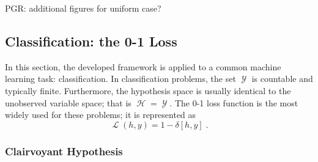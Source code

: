 \documentclass[12pt]{report}
\DeclareMathOperator{\Xcal}{\mathcal{X}}
\DeclareMathOperator{\Ycal}{\mathcal{Y}}
\DeclareMathOperator{\Hcal}{\mathcal{H}}
\DeclareMathOperator{\Lcal}{\mathcal{L}}
\begin{document}
PGR: additional figures for uniform case?

%
%
















\subsection{Classification: the 0-1 Loss}

In this section, the developed framework is applied to a common machine learning task: classification. In classification problems, the set $\Ycal$ is countable and typically finite. Furthermore, the hypothesis space is usually identical to the unobserved variable space; that is $\Hcal = \Ycal$. The 0-1 loss function is the most widely used for these problems; it is represented as
\begin{equation} \label{loss_01}
\Lcal(h,y) = 1 - \delta[h,y] \;.
\end{equation}



\subsubsection{Clairvoyant Hypothesis}
\end{document}
